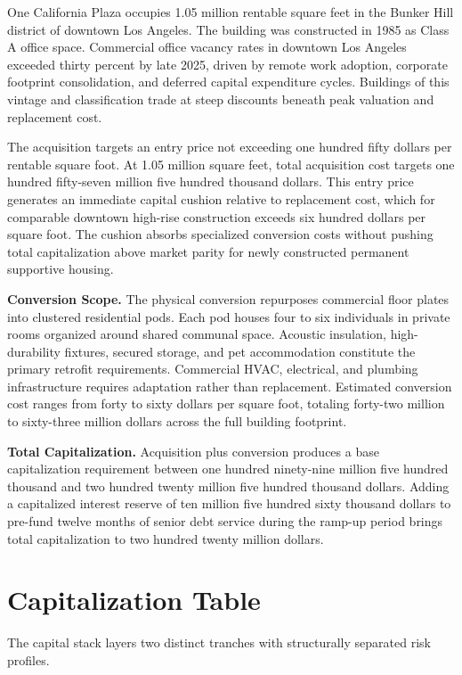 \documentclass[12pt, letterpaper]{article}
\begin{document}
One California Plaza occupies 1.05 million rentable square feet in the Bunker Hill district of downtown Los Angeles. The building was constructed in 1985 as Class A office space. Commercial office vacancy rates in downtown Los Angeles exceeded thirty percent by late 2025, driven by remote work adoption, corporate footprint consolidation, and deferred capital expenditure cycles. Buildings of this vintage and classification trade at steep discounts beneath peak valuation and replacement cost.

The acquisition targets an entry price not exceeding one hundred fifty dollars per rentable square foot. At 1.05 million square feet, total acquisition cost targets one hundred fifty-seven million five hundred thousand dollars. This entry price generates an immediate capital cushion relative to replacement cost, which for comparable downtown high-rise construction exceeds six hundred dollars per square foot. The cushion absorbs specialized conversion costs without pushing total capitalization above market parity for newly constructed permanent supportive housing.

\textbf{Conversion Scope.} The physical conversion repurposes commercial floor plates into clustered residential pods. Each pod houses four to six individuals in private rooms organized around shared communal space. Acoustic insulation, high-durability fixtures, secured storage, and pet accommodation constitute the primary retrofit requirements. Commercial HVAC, electrical, and plumbing infrastructure requires adaptation rather than replacement. Estimated conversion cost ranges from forty to sixty dollars per square foot, totaling forty-two million to sixty-three million dollars across the full building footprint.

\textbf{Total Capitalization.} Acquisition plus conversion produces a base capitalization requirement between one hundred ninety-nine million five hundred thousand and two hundred twenty million five hundred thousand dollars. Adding a capitalized interest reserve of ten million five hundred sixty thousand dollars to pre-fund twelve months of senior debt service during the ramp-up period brings total capitalization to two hundred twenty million dollars.

\clearpage
\section{Capitalization Table}

The capital stack layers two distinct tranches with structurally separated risk profiles.
\end{document}
